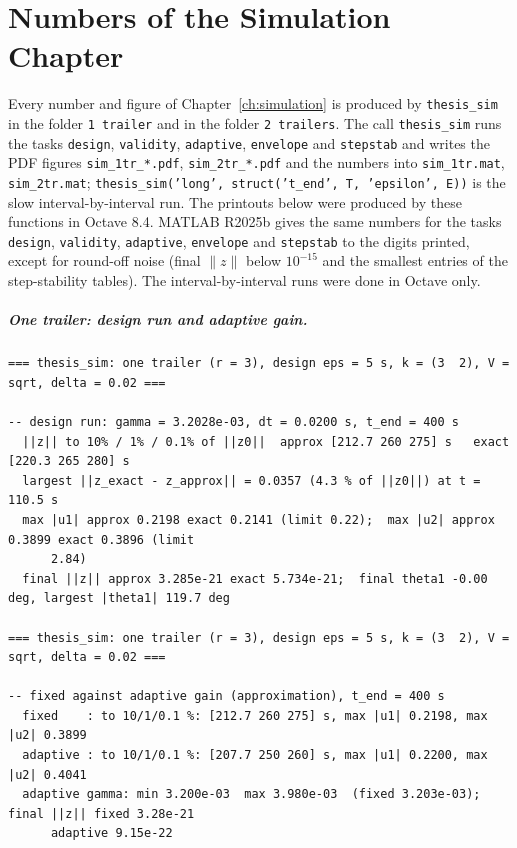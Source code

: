 
\chapter{Numbers of the Simulation Chapter}
\label{app:simulation}

Every number and figure of Chapter~\ref{ch:simulation} is produced by
\texttt{thesis\_sim} in the folder \texttt{1 trailer} and in the folder
\texttt{2 trailers}. The call \texttt{thesis\_sim} runs the tasks \texttt{design},
\texttt{validity}, \texttt{adaptive}, \texttt{envelope} and \texttt{stepstab} and
writes the PDF figures \texttt{sim\_1tr\_*.pdf}, \texttt{sim\_2tr\_*.pdf} and the
numbers into \texttt{sim\_1tr.mat}, \texttt{sim\_2tr.mat};
\texttt{thesis\_sim('long', struct('t\_end', T, 'epsilon', E))} is the slow
interval-by-interval run. The printouts below were produced by these functions
in Octave 8.4. MATLAB R2025b gives the same numbers for the tasks \texttt{design},
\texttt{validity}, \texttt{adaptive}, \texttt{envelope} and \texttt{stepstab} to the digits
printed, except for round-off noise (final $\lVert z\rVert$ below $10^{-15}$ and the smallest
entries of the step-stability tables). The interval-by-interval runs were done in Octave only.

\paragraph{One trailer: design run and adaptive gain.}

{\scriptsize\begin{verbatim}
=== thesis_sim: one trailer (r = 3), design eps = 5 s, k = (3  2), V = sqrt, delta = 0.02 ===

-- design run: gamma = 3.2028e-03, dt = 0.0200 s, t_end = 400 s
  ||z|| to 10% / 1% / 0.1% of ||z0||  approx [212.7 260 275] s   exact [220.3 265 280] s
  largest ||z_exact - z_approx|| = 0.0357 (4.3 % of ||z0||) at t = 110.5 s
  max |u1| approx 0.2198 exact 0.2141 (limit 0.22);  max |u2| approx 0.3899 exact 0.3896 (limit
      2.84)
  final ||z|| approx 3.285e-21 exact 5.734e-21;  final theta1 -0.00 deg, largest |theta1| 119.7 deg

=== thesis_sim: one trailer (r = 3), design eps = 5 s, k = (3  2), V = sqrt, delta = 0.02 ===

-- fixed against adaptive gain (approximation), t_end = 400 s
  fixed    : to 10/1/0.1 %: [212.7 260 275] s, max |u1| 0.2198, max |u2| 0.3899
  adaptive : to 10/1/0.1 %: [207.7 250 260] s, max |u1| 0.2200, max |u2| 0.4041
  adaptive gamma: min 3.200e-03  max 3.980e-03  (fixed 3.203e-03);  final ||z|| fixed 3.28e-21
      adaptive 9.15e-22
\end{verbatim}}

